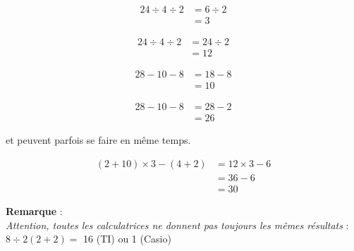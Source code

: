 \documentclass[11pt]{article}
\begin{document}
\begin{minipage}[t]{0.5\textwidth}

\begin{align*}
24 \div 4 \div 2 &= 6 \div 2 \\
                 &= 3
\end{align*}

\end{minipage}\begin{minipage}[t]{0.5\textwidth}

\begin{align*}
24 \div 4 \div 2 &= 24 \div 2 \\
                 &= 12
\end{align*}

\end{minipage}

\begin{minipage}[t]{0.5\textwidth}

\begin{align*}
28 -  10 - 8 &= 18 - 8 \\
             &= 10
\end{align*}

\end{minipage}\begin{minipage}[t]{0.5\textwidth}

\begin{align*}
28 -  10 - 8 &= 28 - 2  \\
             &= 26
\end{align*}

\end{minipage}

\begin{center}
\reversemarginpar\marginnote{$\Box \Box$}
     et peuvent parfois se faire en même temps.
\end{center}  \vspace{-1cm}

\begin{align*}
(2 +  10) \times 3 - (4 +2) &= 12 \times 3 - 6  \\
                            &= 36 - 6 \\
                            &= 30
\end{align*}

\newpage
\textbf{Remarque} : \\
\textit{Attention, toutes les calculatrices ne donnent pas toujours les mêmes résultats} : $8 \div 2(2+2) =$ 16 (TI) ou 1 (Casio)
\end{document}
